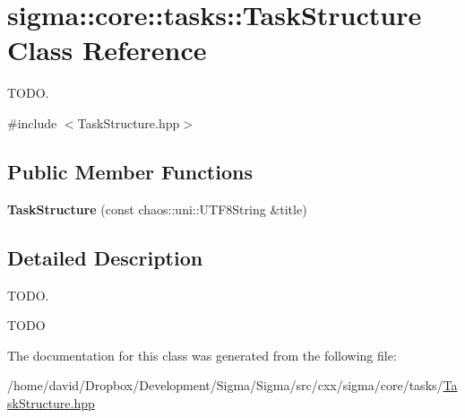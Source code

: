 \hypertarget{classsigma_1_1core_1_1tasks_1_1_task_structure}{\section{sigma\-:\-:core\-:\-:tasks\-:\-:Task\-Structure Class Reference}
\label{classsigma_1_1core_1_1tasks_1_1_task_structure}
}


T\-O\-D\-O.  




{\ttfamily \#include $<$Task\-Structure.\-hpp$>$}

\subsection*{Public Member Functions}
\begin{DoxyCompactItemize}
\item 
\hypertarget{classsigma_1_1core_1_1tasks_1_1_task_structure_a51dce823935e92973e2e35df74337568}{{\bfseries Task\-Structure} (const chaos\-::uni\-::\-U\-T\-F8\-String \&title)}\label{classsigma_1_1core_1_1tasks_1_1_task_structure_a51dce823935e92973e2e35df74337568}

\end{DoxyCompactItemize}


\subsection{Detailed Description}
T\-O\-D\-O. 

T\-O\-D\-O 

The documentation for this class was generated from the following file\-:\begin{DoxyCompactItemize}
\item 
/home/david/\-Dropbox/\-Development/\-Sigma/\-Sigma/src/cxx/sigma/core/tasks/\hyperlink{_task_structure_8hpp}{Task\-Structure.\-hpp}\end{DoxyCompactItemize}
